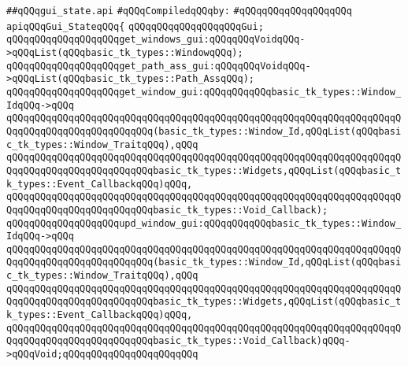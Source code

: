 \label{src/lib/tk/src/gui_state.api}
\verb|##qQQqgui_state.api|\newline
\newline
\verb|#qQQqCompiledqQQqby:|\newline
\verb|#qQQqqQQqqQQqqQQqqQQq|\newline
\newline
\newline
\verb|apiqQQqGui_StateqQQq{|\newline
\newline
\verb|qQQqqQQqqQQqqQQqqQQqGui;|\newline
\newline
\verb|qQQqqQQqqQQqqQQqqQQqget_windows_gui:qQQqqQQqVoidqQQq->qQQqList(qQQqbasic_tk_types::WindowqQQq);|\newline
\verb|qQQqqQQqqQQqqQQqqQQqget_path_ass_gui:qQQqqQQqVoidqQQq->qQQqList(qQQqbasic_tk_types::Path_AssqQQq);|\newline
\verb|qQQqqQQqqQQqqQQqqQQqget_window_gui:qQQqqQQqqQQqbasic_tk_types::Window_IdqQQq->qQQq|\newline
\verb|qQQqqQQqqQQqqQQqqQQqqQQqqQQqqQQqqQQqqQQqqQQqqQQqqQQqqQQqqQQqqQQqqQQqqQQqqQQqqQQqqQQqqQQqqQQqqQQq(basic_tk_types::Window_Id,qQQqList(qQQqbasic_tk_types::Window_TraitqQQq),qQQq|\newline
\verb|qQQqqQQqqQQqqQQqqQQqqQQqqQQqqQQqqQQqqQQqqQQqqQQqqQQqqQQqqQQqqQQqqQQqqQQqqQQqqQQqqQQqqQQqqQQqqQQqbasic_tk_types::Widgets,qQQqList(qQQqbasic_tk_types::Event_CallbackqQQq)qQQq,|\newline
\verb|qQQqqQQqqQQqqQQqqQQqqQQqqQQqqQQqqQQqqQQqqQQqqQQqqQQqqQQqqQQqqQQqqQQqqQQqqQQqqQQqqQQqqQQqqQQqqQQqbasic_tk_types::Void_Callback);|\newline
\verb|qQQqqQQqqQQqqQQqqQQqupd_window_gui:qQQqqQQqqQQqbasic_tk_types::Window_IdqQQq->qQQq|\newline
\verb|qQQqqQQqqQQqqQQqqQQqqQQqqQQqqQQqqQQqqQQqqQQqqQQqqQQqqQQqqQQqqQQqqQQqqQQqqQQqqQQqqQQqqQQqqQQqqQQq(basic_tk_types::Window_Id,qQQqList(qQQqbasic_tk_types::Window_TraitqQQq),qQQq|\newline
\verb|qQQqqQQqqQQqqQQqqQQqqQQqqQQqqQQqqQQqqQQqqQQqqQQqqQQqqQQqqQQqqQQqqQQqqQQqqQQqqQQqqQQqqQQqqQQqqQQqbasic_tk_types::Widgets,qQQqList(qQQqbasic_tk_types::Event_CallbackqQQq)qQQq,|\newline
\verb|qQQqqQQqqQQqqQQqqQQqqQQqqQQqqQQqqQQqqQQqqQQqqQQqqQQqqQQqqQQqqQQqqQQqqQQqqQQqqQQqqQQqqQQqqQQqqQQqbasic_tk_types::Void_Callback)qQQq->qQQqVoid;qQQqqQQqqQQqqQQqqQQqqQQq|\newline

